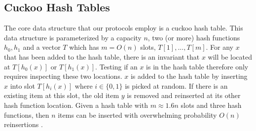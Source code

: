 \subsection{Cuckoo Hash Tables}

The core data structure that our protocols employ is a cuckoo hash table. This data structure is parameterized by a capacity $n$, two (or more) hash functions $h_0, h_1$ and a vector $T$ which has $m=O(n)$ slots, $T[1], ..., T[m]$. For any $x$ that has been added to the hash table, there is an invariant that $x$ will be located at $T[{h_0(x)}]$ or $T[{h_1(x)}]$. Testing if an $x$ is in the hash table therefore only requires inspecting these two locations. $x$ is added to the hash table by inserting $x$ into slot $T[h_i(x)]$ where $i\in \{0,1\}$ is picked at random. If there is an existing item at this slot, the old item $y$ is removed and reinserted at its other hash function location. Given a hash table with $m\approx1.6n$ slots and three hash functions, then $n$ items can be inserted with overwhelming probability $O(n)$ reinsertions \cite{DRRT18}. 
